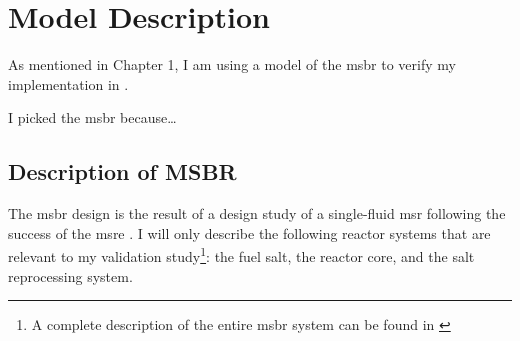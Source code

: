 \chapter{Model Description}
\label{ch:chapter4}
As mentioned in Chapter 1, I am using a model of the \Gls{msbr}
\cite{robertson_conceptual_1971} to verify my \OpenMC implementation in
\SaltProc.

I picked the \Gls{msbr} because\ldots 

\section{Description of MSBR}
\label{sec:msbr_spec}

The \Gls{msbr} design is the result of a design study of a single-fluid
\Gls{msr} following the success of the \Gls{msre}
\cite{haubenreich_experience_1970}\cite{rosenthal_molten-salt_1970}.
I will only describe the following reactor systems that are relevant to
my validation study\footnote{A complete description of the entire \Gls{msbr}
system can be found in \cite{robertson_conceptual_1971}}: the fuel salt, the
reactor core, and the salt reprocessing system.

